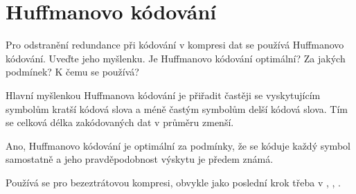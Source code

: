 \section{Huffmanovo kódování}
Pro odstranění redundance při kódování v kompresi dat se používá Huffmanovo kódování. Uveďte jeho myšlenku. Je 
Huffmanovo kódování optimální? Za jakých podmínek? K čemu se používá?

Hlavní myšlenkou Huffmanova kódování je přiřadit častěji se vyskytujícím symbolům kratší kódová slova a méně častým 
symbolům delší kódová slova. Tím se celková délka zakódovaných dat v průměru zmenší.

Ano, Huffmanovo kódování je optimální za podmínky, že se kóduje každý symbol samostatně a jeho pravděpodobnost výskytu 
je předem známá.

Používá se pro bezeztrátovou kompresi, obvykle jako poslední krok třeba v , , .